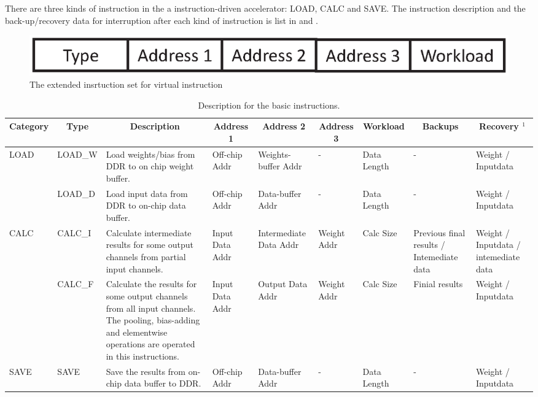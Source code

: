 There are three kinds of instruction in the a instruction-driven accelerator: LOAD, CALC and SAVE. The instruction description and the back-up/recovery data for interruption after each kind of instruction is list in  and .

\begin{figure}[h]
	\centering
	\includegraphics[width=0.9\linewidth]{fig/normal_instr.eps}
	\caption{The extended insrtuction set for virtual instruction }
	\label{fig:normal_instr}
\end{figure}


\begin{table}[t]
	\centering
	\caption{Description for the basic instructions.}
\begin{tabular}{|p{2.7em}|p{3.4em}|p{12.3em}|p{4.2em}|p{4.6em}|p{4.2em}|p{4.2em}||p{4.2em}|p{4.2em}|}
	\hline
	\multicolumn{1}{|c|}{Category} & \multicolumn{1}{c|}{Type} & \multicolumn{1}{c|}{Description} & \multicolumn{1}{c|}{Address 1} & \multicolumn{1}{c|}{Address 2} & \multicolumn{1}{c|}{Address 3} & \multicolumn{1}{c||}{Workload} & \multicolumn{1}{c|}{Backups} & \multicolumn{1}{c|}{Recovery $^1$} \bigstrut\\
	\hline
	\multirow{2}[4]{*}{LOAD} & LOAD\_W & Load weights/bias from DDR to on chip weight buffer. & Off-chip Addr & Weights-buffer Addr & -     & Data  Length & -     & Weight / Inputdata \bigstrut\\
	\cline{2-9}\multicolumn{1}{|c|}{} & LOAD\_D & Load input data from DDR to on-chip data buffer. & Off-chip Addr & Data-buffer Addr & -     & Data  Length & -     & Weight / Inputdata \bigstrut\\
	\hline
	\multirow{2}[4]{*}{CALC} & CALC\_I & Calculate intermediate results for some output channels from partial  input channels. & Input  Data Addr & Intermediate Data Addr & Weight Addr & Calc Size & Previous final results / Intemediate data  & Weight / Inputdata /  intemediate data \bigstrut\\
	\cline{2-9}\multicolumn{1}{|c|}{} & CALC\_F & Calculate the results for some output channels from all input channels. The pooling, bias-adding and elementwise operations are operated in this instructions. & Input  Data Addr & Output  Data Addr & Weight Addr & Calc Size & Finial results & Weight / Inputdata \bigstrut\\
	\hline
	SAVE  & SAVE  & Save the results from on-chip data buffer to DDR. & Off-chip Addr & Data-buffer Addr & -     & Data  Length & -     & Weight / Inputdata \bigstrut\\
	\hline
	\end{tabular}%
	
	\label{tab:instr}%
  \end{table}%


